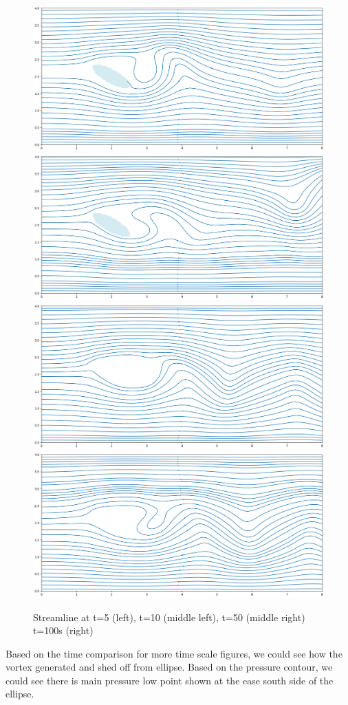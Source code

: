 \documentclass[12pt]{article}
\begin{document}
\begin{figure}[H]
    \centering
    \includegraphics[width=0.23\linewidth]{figure/Ellip_N32_Re300_8x4_t05/stline_Ellip_N32_Re300_8x4_t05.jpg}
    \includegraphics[width=0.23\linewidth]{figure/Ellip_N32_Re300_8x4_t10/stline_Ellip_N32_Re300_8x4_t10.jpg}
    \includegraphics[width=0.23\linewidth]{figure/Ellip_N32_Re300_8x4_t50/stline_Ellip_N32_Re300_8x4_t50.jpg}
    \includegraphics[width=0.23\linewidth]{figure/Ellip_N32_Re300_8x4_t100/stline_Ellip_N32_Re300_8x4_t100.jpg}
    \caption{Streamline at t=5 (left), t=10 (middle left), t=50 (middle right) t=100s (right)}
\end{figure}

Based on the time comparison for more time scale figures, we could see how the vortex generated and shed off from ellipse. Based on the pressure contour, we could see there is main pressure low point shown at the ease south side of the ellipse. 
\end{document}
